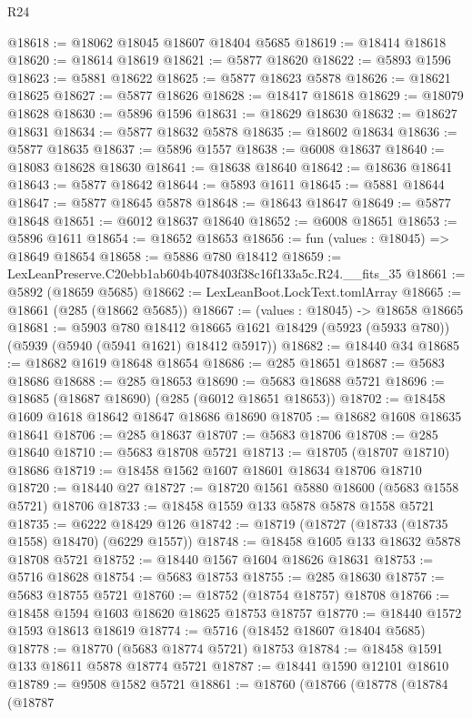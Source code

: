 \begin{lexlean}{R24}
\begin{coremodule}
@18618 := @18062 @18045 @18607 @18404 @5685
@18619 := @18414 @18618
@18620 := @18614 @18619
@18621 := @5877 @18620
@18622 := @5893 @1596
@18623 := @5881 @18622
@18625 := @5877 @18623 @5878
@18626 := @18621 @18625
@18627 := @5877 @18626
@18628 := @18417 @18618
@18629 := @18079 @18628
@18630 := @5896 @1596
@18631 := @18629 @18630
@18632 := @18627 @18631
@18634 := @5877 @18632 @5878
@18635 := @18602 @18634
@18636 := @5877 @18635
@18637 := @5896 @1557
@18638 := @6008 @18637
@18640 := @18083 @18628 @18630
@18641 := @18638 @18640
@18642 := @18636 @18641
@18643 := @5877 @18642
@18644 := @5893 @1611
@18645 := @5881 @18644
@18647 := @5877 @18645 @5878
@18648 := @18643 @18647
@18649 := @5877 @18648
@18651 := @6012 @18637 @18640
@18652 := @6008 @18651
@18653 := @5896 @1611
@18654 := @18652 @18653
@18656 := fun (values : @18045) => @18649 @18654
@18658 := @5886 @780 @18412
@18659 := LexLeanPreserve.C20ebb1ab604b4078403f38c16f133a5c.R24.__fits_35
@18661 := @5892 (@18659 @5685)
@18662 := LexLeanBoot.LockText.tomlArray
@18665 := @18661 (@285 (@18662 @5685))
@18667 := (values : @18045) -> @18658 @18665
@18681 := @5903
    @780
    @18412
    @18665
    @1621
    @18429
    (@5923 (@5933 @780))
    (@5939 (@5940 (@5941 @1621) @18412 @5917))
@18682 := @18440 @34
@18685 := @18682 @1619 @18648 @18654
@18686 := @285 @18651
@18687 := @5683 @18686
@18688 := @285 @18653
@18690 := @5683 @18688 @5721
@18696 := @18685 (@18687 @18690) (@285 (@6012 @18651 @18653))
@18702 := @18458 @1609 @1618 @18642 @18647 @18686 @18690
@18705 := @18682 @1608 @18635 @18641
@18706 := @285 @18637
@18707 := @5683 @18706
@18708 := @285 @18640
@18710 := @5683 @18708 @5721
@18713 := @18705 (@18707 @18710) @18686
@18719 := @18458 @1562 @1607 @18601 @18634 @18706 @18710
@18720 := @18440 @27
@18727 := @18720 @1561 @5880 @18600 (@5683 @1558 @5721) @18706
@18733 := @18458 @1559 @133 @5878 @5878 @1558 @5721
@18735 := @6222 @18429 @126
@18742 := @18719 (@18727 (@18733 (@18735 @1558) @18470) (@6229 @1557))
@18748 := @18458 @1605 @133 @18632 @5878 @18708 @5721
@18752 := @18440 @1567 @1604 @18626 @18631
@18753 := @5716 @18628
@18754 := @5683 @18753
@18755 := @285 @18630
@18757 := @5683 @18755 @5721
@18760 := @18752 (@18754 @18757) @18708
@18766 := @18458 @1594 @1603 @18620 @18625 @18753 @18757
@18770 := @18440 @1572 @1593 @18613 @18619
@18774 := @5716 (@18452 @18607 @18404 @5685)
@18778 := @18770 (@5683 @18774 @5721) @18753
@18784 := @18458 @1591 @133 @18611 @5878 @18774 @5721
@18787 := @18441 @1590 @12101 @18610
@18789 := @9508 @1582 @5721
@18861 := @18760
    (@18766
      (@18778
        (@18784
          (@18787

\end{coremodule}
\end{lexlean}
